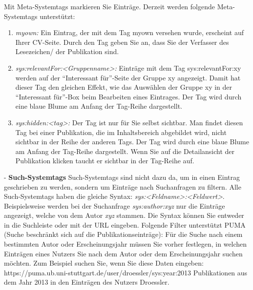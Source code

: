 Mit Meta-Systemtags markieren Sie Einträge. Derzeit werden folgende Meta-Systemtags unterstützt:
\begin{enumerate}
    \item \textit{myown:} Ein Eintrag, der mit dem Tag myown versehen wurde, erscheint auf Ihrer CV-Seite. Durch den Tag geben Sie an, dass Sie der Verfasser des Lesezeichen/ der Publikation sind.
    \item \textit{sys:relevantFor:<Gruppenname>:} Einträge mit dem Tag sys:relevantFor:xy werden auf der \enquote{Interessant für}-Seite der Gruppe xy angezeigt. Damit hat dieser Tag den gleichen Effekt, wie das  Auswählen der Gruppe xy in der \enquote{Interessant für}-Box beim Bearbeiten eines Eintrages. Der Tag wird durch eine blaue Blume am Anfang der Tag-Reihe dargestellt. 
    \item \textit{sys:hidden:<tag>:} Der Tag ist nur für Sie selbst sichtbar. Man findet diesen Tag bei einer Publikation, die im Inhaltsbereich abgebildet wird, nicht sichtbar in der Reihe der anderen Tags. Der Tag wird durch eine blaue Blume am Anfang der Tag-Reihe dargestellt. Wenn Sie auf die Detailansicht der Publikation klicken taucht er sichtbar in der Tag-Reihe auf.
\end{enumerate}
- \textbf{Such-Systemtags}\newline
Such-Systemtags sind nicht dazu da, um in einen Eintrag geschrieben zu werden, sondern um Einträge nach Suchanfragen zu filtern. Alle Such-Systemtags haben die gleiche Syntax: \textit{sys:<Feldname>:<Feldwert>}. Beispielsweise werden  bei der Suchanfrage \textit{sys:author:xyz} nur die Einträge angezeigt, welche von dem Autor \textit{xyz} stammen.\newline
Die Syntax können Sie entweder in die Suchleiste oder mit der URL eingeben. Folgende Filter unterstützt PUMA (Suche beschränkt sich auf die Publikationseinträge):\newline
\newline
Für die Suche nach einem bestimmten Autor oder Erscheinungsjahr müssen Sie vorher festlegen, in welchen Einträgen eines Nutzers Sie nach dem Autor oder dem Erscheinungsjahr suchen möchten. Zum Beispiel suchen Sie, wenn Sie diese Daten eingeben:  https://puma.ub.uni-stuttgart.de/user/droessler/sys:year:2013  Publikationen aus dem Jahr 2013 in den Einträgen des Nutzers Droessler. 
